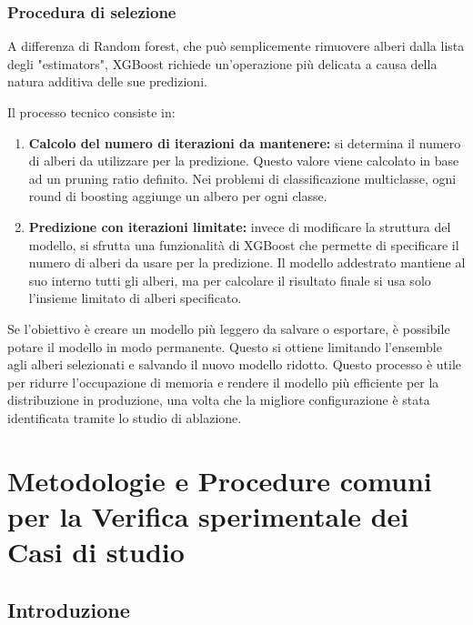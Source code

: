 \documentclass[a4paper,12pt]{report}
\begin{document}
	\subsection{Procedura di selezione}
	A differenza di Random forest, che può semplicemente rimuovere alberi dalla lista degli "estimators", XGBoost richiede un'operazione più delicata a causa della natura additiva delle sue predizioni.
	
	Il processo tecnico consiste in:
	\begin{enumerate}
		\item \textbf{Calcolo del numero di iterazioni da mantenere:} si determina il numero di alberi da utilizzare per la predizione. Questo valore viene calcolato in base ad un pruning ratio definito. Nei problemi di classificazione multiclasse, ogni round di boosting aggiunge un albero per ogni classe.
		\item \textbf{Predizione con iterazioni limitate:} invece di modificare la struttura del modello, si sfrutta una funzionalità di XGBoost che permette di specificare il numero di alberi da usare per la predizione. Il modello addestrato mantiene al suo interno tutti gli alberi, ma per calcolare il risultato finale si usa solo l'insieme limitato di alberi specificato.
	\end{enumerate}
	
	Se l'obiettivo è creare un modello più leggero da salvare o esportare, è possibile potare il modello in modo permanente. Questo si ottiene limitando l'ensemble agli alberi selezionati e salvando il nuovo modello ridotto. Questo processo è utile per ridurre l'occupazione di memoria e rendere il modello più efficiente per la distribuzione in produzione, una volta che la migliore configurazione è stata identificata tramite lo studio di ablazione.
	
	\chapter{Metodologie e Procedure comuni per la Verifica sperimentale dei Casi di studio}
	
	\section{Introduzione}
	
\end{document}
